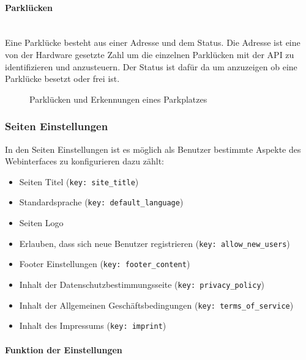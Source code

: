 \paragraph{Parklücken}\mbox{}\\
Eine Parklücke besteht aus einer Adresse und dem Status. Die Adresse ist eine
von der Hardware gesetzte Zahl um die einzelnen Parklücken mit der API zu
identifizieren und anzusteuern. Der Status ist dafür da um anzuzeigen ob eine Parklücke besetzt
oder frei ist.

\begin{figure}[H]
  \centering
  \caption{Parklücken und Erkennungen eines Parkplatzes}
\end{figure}

\subsubsection{Seiten Einstellungen}
In den Seiten Einstellungen ist es möglich als Benutzer bestimmte Aspekte des
Webinterfaces zu konfigurieren dazu zählt:

\begin{itemize}
  \item Seiten Titel (\verb|key: site_title|)
  \item Standardsprache (\verb|key: default_language|)
  \item Seiten Logo
  \item Erlauben, dass sich neue Benutzer registrieren (\verb|key: allow_new_users|)
  \item Footer Einstellungen (\verb|key: footer_content|)
  \item Inhalt der Datenschutzbestimmungsseite (\verb|key: privacy_policy|)
  \item Inhalt der Allgemeinen Geschäftsbedingungen (\verb|key: terms_of_service|)
  \item Inhalt des Impressums (\verb|key: imprint|)
\end{itemize}

\paragraph{Funktion der Einstellungen}\mbox{}\\

